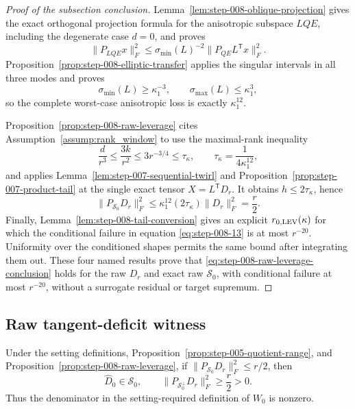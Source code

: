 \begin{proof}[Proof of the subsection conclusion]

Lemma~\ref{lem:step-008-oblique-projection} gives the exact orthogonal
projection formula for the anisotropic subspace \(LQE\), including the
degenerate case \(d=0\), and proves
\[
  \|P_{LQE}x\|_F^2
  \le\sigma_{\min}(L)^{-2}\|P_{QE}L^{\mathsf T}x\|_F^2.
\]
Proposition~\ref{prop:step-008-elliptic-transfer} applies the singular intervals in all three modes and proves
\[
  \sigma_{\min}(L)\ge\kappa_1^{-3},
  \qquad
  \sigma_{\max}(L)\le\kappa_1^3,
\]
so the complete worst-case anisotropic loss is exactly
\(\kappa_1^{12}\).

Proposition~\ref{prop:step-008-raw-leverage} cites
Assumption~\ref{assump:rank_window} to use the maximal-rank inequality
\[
  \frac d{r^3}\le\frac{3k}{r^2}\le3r^{-3/4}
  \le\tau_\kappa,
  \qquad
  \tau_\kappa=\frac1{4\kappa_1^{12}},
\]
and applies Lemma~\ref{lem:step-007-sequential-twirl} and
Proposition~\ref{prop:step-007-product-tail} at the single exact
tensor \(X=L^{\mathsf T}D_r\). It obtains
\(h\le2\tau_\kappa\), hence
\[
  \|P_{\mathscr S_0}D_r\|_F^2
  \le\kappa_1^{12}(2\tau_\kappa)\|D_r\|_F^2
  =\frac r2.
\]
Finally, Lemma~\ref{lem:step-008-tail-conversion} gives an explicit
\(r_{0,\rm LEV}(\kappa)\) for which the conditional failure in equation
\eqref{eq:step-008-13} is at most \(r^{-20}\). Uniformity over the conditioned shapes permits
the same bound after integrating them out. These four named results prove
that \eqref{eq:step-008-raw-leverage-conclusion} holds for the raw \(D_r\) and exact raw
\(\mathscr S_0\), with conditional failure at most \(r^{-20}\), without a
surrogate residual or target supremum.

\end{proof}

\subsection{Raw tangent-deficit witness}\label{app:step-009}

\begin{lemma}
\label{lem:step-009-normal-energy}
Under the setting definitions,
Proposition~\ref{prop:step-005-quotient-range}, and
Proposition~\ref{prop:step-008-raw-leverage}, if
\(\|P_{\mathscr S_0}D_r\|_F^2\le r/2\), then
\begin{equation}
  \widehat D_0\in\mathscr S_0,
  \qquad
  \|P_{\mathscr S_0^\perp}D_r\|_F^2\ge\frac r2>0.
  \label{eq:step-009-2}
\end{equation}
Thus the denominator in the setting-required definition of \(W_0\) is
nonzero.

\end{lemma}

